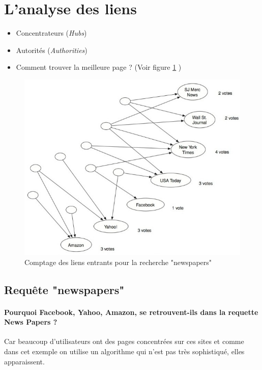 \section{L'analyse des liens}
\begin{itemize}
\item Concentrateurs (\textit{Hubs})
\item Autorités (\textit{Authorities})
\item Comment trouver la meilleure page ? (Voir figure \ref{fig-14-1}	)
\end{itemize}



\begin{figure}[!ht]
\centering
\includegraphics[scale=0.5]{images/ref/fig-14-1.jpeg}
\caption{Comptage des liens entrants pour la recherche "newspapers"}
\label{fig-14-1}
\end{figure}

\subsection*{Requête "newspapers"}

\paragraph{Pourquoi Facebook, Yahoo, Amazon, se retrouvent-ils dans la requette News Papers ?}
Car beaucoup d'utilisateurs ont des pages concentrées sur ces sites et comme dans cet exemple on utilise un algorithme qui n'est pas très sophistiqué, elles apparaissent. 

